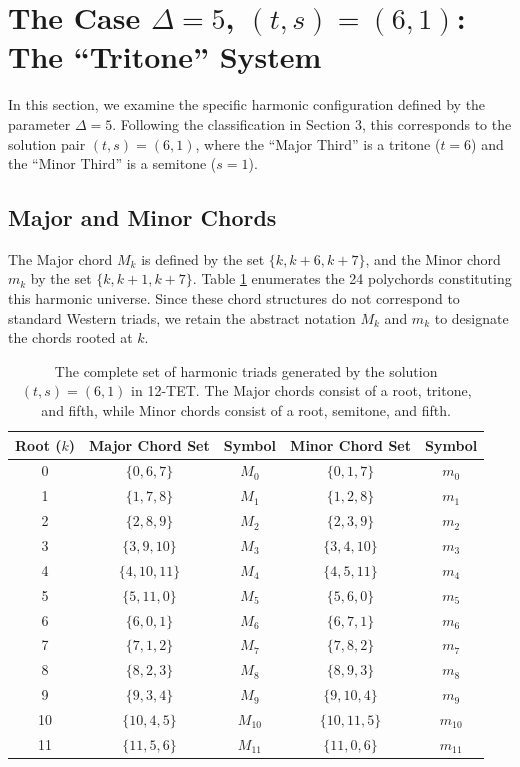 \documentclass[12pt,letterpaper]{amsart}
\begin{document}
\section{The Case $\Delta=5$, $(t,s)=(6,1)$: The ``Tritone'' System}

In this section, we examine the specific harmonic configuration defined by the parameter $\Delta=5$. Following the classification in Section 3, this corresponds to the solution pair $(t, s) = (6, 1)$, where the ``Major Third'' is a tritone ($t=6$) and the ``Minor Third'' is a semitone ($s=1$).

\subsection{Major and Minor Chords}

The Major chord $M_k$ is defined by the set $\{k, k+6, k+7\}$, and the Minor chord $m_k$ by the set $\{k, k+1, k+7\}$. Table \ref{tab:delta5} enumerates the 24 polychords constituting this harmonic universe. Since these chord structures do not correspond to standard Western triads, we retain the abstract notation $M_k$ and $m_k$ to designate the chords rooted at $k$.

\begin{table}[H]
   \centering
   \scriptsize 
    \renewcommand{\arraystretch}{0.7}
    \begin{tabular}{|c|c|c|c|c|}
        \hline
        \textbf{Root ($k$)} & \textbf{Major Chord Set} & \textbf{Symbol} & \textbf{Minor Chord Set} & \textbf{Symbol} \\
        \hline
        0 & $\{0, 6, 7\}$ & $M_0$ & $\{0, 1, 7\}$ & $m_0$ \\
        1 & $\{1, 7, 8\}$ & $M_1$ & $\{1, 2, 8\}$ & $m_1$ \\
        2 & $\{2, 8, 9\}$ & $M_2$ & $\{2, 3, 9\}$ & $m_2$ \\
        3 & $\{3, 9, 10\}$ & $M_3$ & $\{3, 4, 10\}$ & $m_3$ \\
        4 & $\{4, 10, 11\}$ & $M_4$ & $\{4, 5, 11\}$ & $m_4$ \\
        5 & $\{5, 11, 0\}$ & $M_5$ & $\{5, 6, 0\}$ & $m_5$ \\
        6 & $\{6, 0, 1\}$ & $M_6$ & $\{6, 7, 1\}$ & $m_6$ \\
        7 & $\{7, 1, 2\}$ & $M_7$ & $\{7, 8, 2\}$ & $m_7$ \\
        8 & $\{8, 2, 3\}$ & $M_8$ & $\{8, 9, 3\}$ & $m_8$ \\
        9 & $\{9, 3, 4\}$ & $M_9$ & $\{9, 10, 4\}$ & $m_9$ \\
        10 & $\{10, 4, 5\}$ & $M_{10}$ & $\{10, 11, 5\}$ & $m_{10}$ \\
        11 & $\{11, 5, 6\}$ & $M_{11}$ & $\{11, 0, 6\}$ & $m_{11}$ \\
        \hline
    \end{tabular}
    \caption{The complete set of harmonic triads generated by the solution $(t,s)=(6,1)$ in 12-TET. The Major chords consist of a root, tritone, and fifth, while Minor chords consist of a root, semitone, and fifth.}
    \label{tab:delta5}
\end{table}
\end{document}
